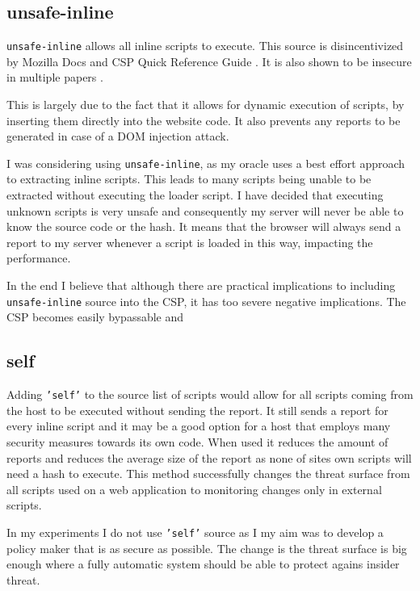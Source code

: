 \subsection{unsafe-inline}

\texttt{unsafe-inline} allows all inline scripts to execute. 
This source is disincentivized by Mozilla Docs \cite{unsafeinlinebad2} and CSP Quick Reference Guide \cite{unsafeinlinebad1}.
It is also shown to be insecure in multiple papers \cite{weichselbaum2016csp} \cite{osti_10173479}.

This is largely due to the fact that it allows for dynamic execution of scripts, by inserting them directly into the website code.
It also prevents any reports to be generated in case of a DOM injection attack.

I was considering using \texttt{unsafe-inline}, as my oracle uses a best effort approach to extracting inline scripts.
This leads to many scripts being unable to be extracted without executing the loader script.
I have decided that executing unknown scripts is very unsafe and consequently my server will never be able to know the source code or the hash.
It means that the browser will always send a report to my server whenever a script is loaded in this way, impacting the performance.

In the end I believe that although there are practical implications to including \texttt{unsafe-inline} source into the CSP, it has too severe negative implications.
The CSP becomes easily bypassable and 

\subsection{self}

Adding \texttt{'self'} to the source list of scripts would allow for all scripts coming from the host to be executed without sending the report.
It still sends a report for every inline script and it  may be a good option for a host that employs many security measures towards its own code.
When used it reduces the amount of reports and reduces the average size of the report as none of sites own scripts will need a hash to execute.
This method successfully changes the threat surface from all scripts used on a web application to monitoring changes only in external scripts.

In my experiments I do not use \texttt{'self'} source as I my aim was to develop a policy maker that is as secure as possible.
The change is the threat surface is big enough where a fully automatic system should be able to protect agains insider threat.

